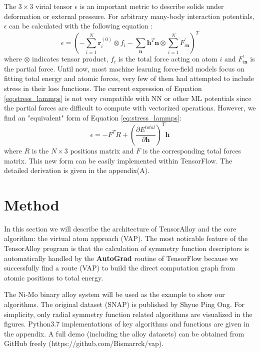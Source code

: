 \documentclass[preprint]{revtex4-2}
\begin{document}
The $3 \times 3$ virial tensor $\epsilon$ is an important metric to 
describe solids under deformation or external pressure. For arbitrary many-body 
interaction potentials, $\epsilon$ can be calculated with the following equation
\cite{lammps_stress}:
\begin{equation}
\label{eq:stress_lammps}
\epsilon = \left(-\sum_{i=1}^{N}{\mathbf{r}_i^{(0)} \otimes f_i} - 
\sum_{\mathbf{n}}{\mathbf{h}^T\mathbf{n}} \otimes 
\sum_{i=1}^{N}{F^{\prime}_{i\mathbf{n}}}
\right)^T
\end{equation}
where $\otimes$ indicates tensor product, $f_i$ is the total 
force acting on atom $i$ and $F^{\prime}_{i\mathbf{n}}$ is the partial force. 
Until now, most machine learning force-field models focus on fitting total 
energy and atomic forces, very few of them\cite{DeePMD,DeePMD_rl,DeePMD_kit} had 
attempted to include stress in their loss functions. 
The current expression of Equation \ref{eq:stress_lammps} is not very compatible 
with NN or other ML potentials since the partial forces are difficult to compute 
with vectorized operations. However, we find an "equivalent" form 
of Equation \ref{eq:stress_lammps}:
\begin{equation}
\label{eq:stress}
\epsilon = -F^{T} R + 
\left(\frac{\partial E^{total}}{\partial \mathbf{h}}\right)^T \mathbf{h}
\end{equation}
where $R$ is the $N \times 3$ positions matrix and $F$ is the 
corresponding total forces matrix. This new form can be easily implemented 
within TensorFlow. The detailed derivation is given in the appendix(A).

% 
%
\section{Method}
\label{section:method}

In this section we will describe the architecture of TensorAlloy and the core 
algorithm: the virtual atom approach (VAP). The most noticable feature of the 
TensorAlloy program is that the calculation of symmetry function descriptors is 
automatically handled by the \textbf{AutoGrad}\cite{tensorflow} routine of 
TensorFlow because we successfully find a route (VAP) to build the direct 
computation graph from atomic positions to total energy.

The Ni-Mo binary alloy system will be used as the example to show our 
algorithms. The original dataset (SNAP) is published by Shyue Ping 
Ong\cite{SNAP_2018}. 
For simplicity, only radial symmetry function related algorithms are 
visualized in the figures. Python3.7 implementations of key algorithms and 
functions are given in the appendix. A full demo (including the alloy datasets) 
can be obtained from GitHub freely (https://github.com/Bismarrck/vap).
\end{document}
